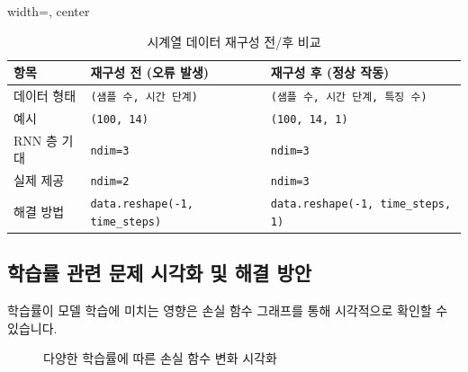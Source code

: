 \documentclass[11pt,a4paper]{article}
\theoremstyle{definition}
\begin{document}
\begin{table}[h!]
\centering
\caption{시계열 데이터 재구성 전/후 비교}
\label{tab:reshape_comparison}
\begin{adjustbox}{width=\textwidth, center}
\begin{tabular}{lll}
\toprule
\textbf{항목} & \textbf{재구성 전 (오류 발생)} & \textbf{재구성 후 (정상 작동)} \\
\midrule
데이터 형태 & \texttt{(샘플 수, 시간 단계)} & \texttt{(샘플 수, 시간 단계, 특징 수)} \\
예시 & \texttt{(100, 14)} & \texttt{(100, 14, 1)} \\
RNN 층 기대 & \texttt{ndim=3} & \texttt{ndim=3} \\
실제 제공 & \texttt{ndim=2} & \texttt{ndim=3} \\
해결 방법 & \texttt{data.reshape(-1, time_steps)} & \texttt{data.reshape(-1, time_steps, 1)} \\
\bottomrule
\end{tabular}
\end{adjustbox}
\end{table}

\subsection{학습률 관련 문제 시각화 및 해결 방안}
학습률이 모델 학습에 미치는 영향은 손실 함수 그래프를 통해 시각적으로 확인할 수 있습니다.

\begin{figure}[h!]
\centering
\caption{다양한 학습률에 따른 손실 함수 변화 시각화}
\label{fig:lr_visualization}
\end{figure}
\end{document}
